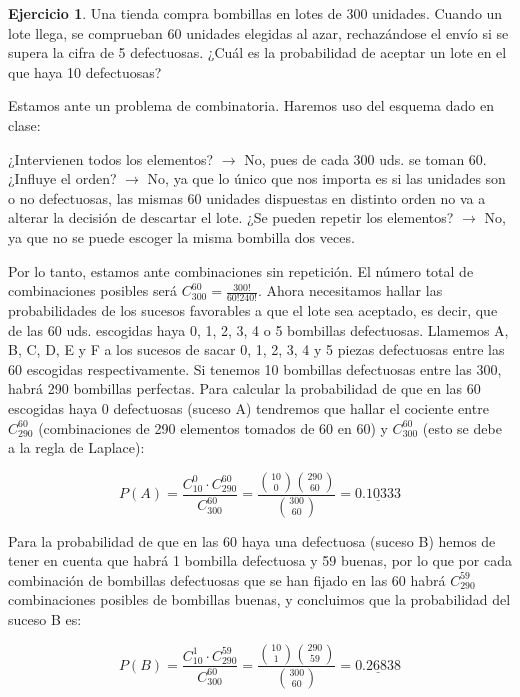 \documentclass[a4paper, 12pt]{article}
\theoremstyle{definition}
\newtheorem{ej}{Ejercicio}
\begin{document}
\begin{ej}
Una tienda compra bombillas en lotes de 300 unidades. Cuando un lote llega, se comprueban 60
unidades elegidas al azar, rechazándose el envío si se supera la cifra de 5 defectuosas. ¿Cuál es
la probabilidad de aceptar un lote en el que haya 10 defectuosas?

\medskip

Estamos ante un problema de combinatoria. Haremos uso del esquema dado en clase:

\medskip

¿Intervienen todos los elementos? $\longrightarrow$ No, pues de cada 300 uds. se toman 60.
\newline
¿Influye el orden? $\longrightarrow$ No, ya que lo único que nos importa es si las unidades son o no defectuosas, las mismas 60 unidades dispuestas en distinto orden no va a alterar la decisión de descartar el lote.
\newline
¿Se pueden repetir los elementos? $\longrightarrow$ No, ya que no se puede escoger la misma bombilla dos veces.

Por lo tanto, estamos ante combinaciones sin repetición. El número total de combinaciones posibles será $C_{300}^{60} = \frac{300!}{60!240!}$. Ahora necesitamos hallar las probabilidades de los sucesos favorables a que el lote sea aceptado, es decir, que de las 60 uds. escogidas haya 0, 1, 2, 3, 4 o 5 bombillas defectuosas. Llamemos A, B, C, D, E y F a los sucesos de sacar 0, 1, 2, 3, 4 y 5 piezas defectuosas entre las 60 escogidas respectivamente. Si tenemos 10 bombillas defectuosas entre las 300, habrá 290 bombillas perfectas. Para calcular la probabilidad de que en las 60 escogidas haya 0 defectuosas (suceso A) tendremos que hallar el cociente entre $C_{290}^{60}$ (combinaciones de 290 elementos tomados de 60 en 60) y $C_{300}^{60}$ (esto se debe a la regla de Laplace):

\[
    P(A) = \frac{C_{10}^{0} \cdot C_{290}^{60}}{C_{300}^{60}} = \frac{\binom{10}{0} \binom{290}{60}}{\binom{300}{60}} = \underline{0.10333} 
\]

Para la probabilidad de que en las 60 haya una defectuosa (suceso B) hemos de tener en cuenta que habrá 1 bombilla defectuosa y 59 buenas, por lo que por cada combinación de bombillas defectuosas que se han fijado en las 60 habrá $C_{290}^{59}$ combinaciones posibles de bombillas buenas, y concluimos que la probabilidad del suceso B es:

\[
    P(B) = \frac{C_{10}^{1} \cdot C_{290}^{59}}{C_{300}^{60}} = \frac{\binom{10}{1} \binom{290}{59}}{\binom{300}{60}} = \underline{0.26838}
\]


\end{ej}
\end{document}
